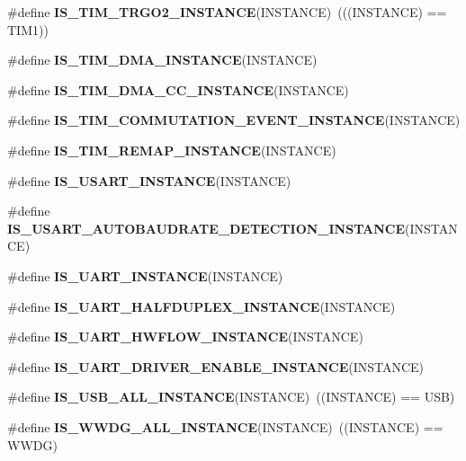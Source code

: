\begin{DoxyCompactItemize}
\item 
\mbox{\label{group___exported__macro_ga68305c0173caf4e109020403624d252f}} 
\#define {\bfseries I\+S\+\_\+\+T\+I\+M\+\_\+\+T\+R\+G\+O2\+\_\+\+I\+N\+S\+T\+A\+N\+CE}(I\+N\+S\+T\+A\+N\+CE)~(((I\+N\+S\+T\+A\+N\+CE) == T\+I\+M1))
\item 
\#define {\bfseries I\+S\+\_\+\+T\+I\+M\+\_\+\+D\+M\+A\+\_\+\+I\+N\+S\+T\+A\+N\+CE}(I\+N\+S\+T\+A\+N\+CE)
\item 
\#define {\bfseries I\+S\+\_\+\+T\+I\+M\+\_\+\+D\+M\+A\+\_\+\+C\+C\+\_\+\+I\+N\+S\+T\+A\+N\+CE}(I\+N\+S\+T\+A\+N\+CE)
\item 
\#define {\bfseries I\+S\+\_\+\+T\+I\+M\+\_\+\+C\+O\+M\+M\+U\+T\+A\+T\+I\+O\+N\+\_\+\+E\+V\+E\+N\+T\+\_\+\+I\+N\+S\+T\+A\+N\+CE}(I\+N\+S\+T\+A\+N\+CE)
\item 
\#define {\bfseries I\+S\+\_\+\+T\+I\+M\+\_\+\+R\+E\+M\+A\+P\+\_\+\+I\+N\+S\+T\+A\+N\+CE}(I\+N\+S\+T\+A\+N\+CE)
\item 
\#define {\bfseries I\+S\+\_\+\+U\+S\+A\+R\+T\+\_\+\+I\+N\+S\+T\+A\+N\+CE}(I\+N\+S\+T\+A\+N\+CE)
\item 
\#define {\bfseries I\+S\+\_\+\+U\+S\+A\+R\+T\+\_\+\+A\+U\+T\+O\+B\+A\+U\+D\+R\+A\+T\+E\+\_\+\+D\+E\+T\+E\+C\+T\+I\+O\+N\+\_\+\+I\+N\+S\+T\+A\+N\+CE}(I\+N\+S\+T\+A\+N\+CE)
\item 
\#define {\bfseries I\+S\+\_\+\+U\+A\+R\+T\+\_\+\+I\+N\+S\+T\+A\+N\+CE}(I\+N\+S\+T\+A\+N\+CE)
\item 
\#define {\bfseries I\+S\+\_\+\+U\+A\+R\+T\+\_\+\+H\+A\+L\+F\+D\+U\+P\+L\+E\+X\+\_\+\+I\+N\+S\+T\+A\+N\+CE}(I\+N\+S\+T\+A\+N\+CE)
\item 
\#define {\bfseries I\+S\+\_\+\+U\+A\+R\+T\+\_\+\+H\+W\+F\+L\+O\+W\+\_\+\+I\+N\+S\+T\+A\+N\+CE}(I\+N\+S\+T\+A\+N\+CE)
\item 
\#define {\bfseries I\+S\+\_\+\+U\+A\+R\+T\+\_\+\+D\+R\+I\+V\+E\+R\+\_\+\+E\+N\+A\+B\+L\+E\+\_\+\+I\+N\+S\+T\+A\+N\+CE}(I\+N\+S\+T\+A\+N\+CE)
\item 
\mbox{\label{group___exported__macro_ga763f287042e73e61b91e12bb065777cd}} 
\#define {\bfseries I\+S\+\_\+\+U\+S\+B\+\_\+\+A\+L\+L\+\_\+\+I\+N\+S\+T\+A\+N\+CE}(I\+N\+S\+T\+A\+N\+CE)~((I\+N\+S\+T\+A\+N\+CE) == U\+SB)
\item 
\mbox{\label{group___exported__macro_gac2a8aaec233e19987232455643a04d6f}} 
\#define {\bfseries I\+S\+\_\+\+W\+W\+D\+G\+\_\+\+A\+L\+L\+\_\+\+I\+N\+S\+T\+A\+N\+CE}(I\+N\+S\+T\+A\+N\+CE)~((I\+N\+S\+T\+A\+N\+CE) == W\+W\+DG)

\end{DoxyCompactItemize}

